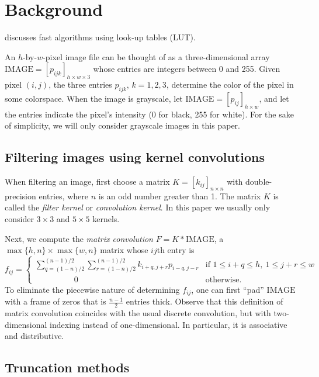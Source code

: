 \documentclass[12pt]{amsart}
\theoremstyle{definition}
\theoremstyle{remark}
\numberwithin{thm}{section}
\newcommand{\IMAGE}{\text{IMAGE}}
\begin{document}
\section{Background}

\cite{WSLQE06} discusses fast algorithms using look-up tables (LUT).



An $h$-by-$w$-pixel image file can be thought of as a three-dimensional array $\IMAGE = \left[p_{ijk}\right]_{h\times w\times 3}$ whose entries are integers between 0 and 255. Given pixel $(i,j)$, the three entries $p_{ijk}$, $k=1,2,3$, determine the color of the pixel in some colorspace. When the image is grayscale, let $\IMAGE = [p_{ij}]_{h\times w}$, and let the entries indicate the pixel's intensity (0 for black, 255 for white). For the sake of simplicity, we will only consider grayscale images in this paper.

\subsection{Filtering images using kernel convolutions}

When filtering an image, first choose a matrix $K = [k_{ij}]_{n\times n}$ with double-precision entries, where $n$ is an odd number greater than 1. The matrix $K$ is called the \emph{filter kernel} or \emph{convolution kernel}. In this paper we usually only consider $3\times3$ and $5\times5$ kernels.

Next, we compute the \emph{matrix convolution} $F = K * \IMAGE$,  a $\max\{h,n\}\times\max\{w,n\}$ matrix whose $ij$th entry is
\[f_{ij} = \begin{cases}
\displaystyle\sum_{q = (1-n)/2}^{(n-1)/2}\sum_{r = (1-n)/2}^{(n-1)/2}k_{i+q,j+r}p_{i-q,j-r} & \textrm{if } 1\le i+q \le h,\ 1 \le j+r \le w\\
\hspace{2cm} 0 & \textrm{otherwise}.
\end{cases}\]
To eliminate the piecewise nature of determining $f_{ij}$, one can first ``pad'' $\IMAGE$ with a frame of zeros that is $\frac{n-1}{2}$ entries thick. Observe that this definition of matrix convolution coincides with the usual discrete convolution, but with two-dimensional indexing instead of one-dimensional. In particular, it is associative and distributive.

\subsection{Truncation methods}
\end{document}
